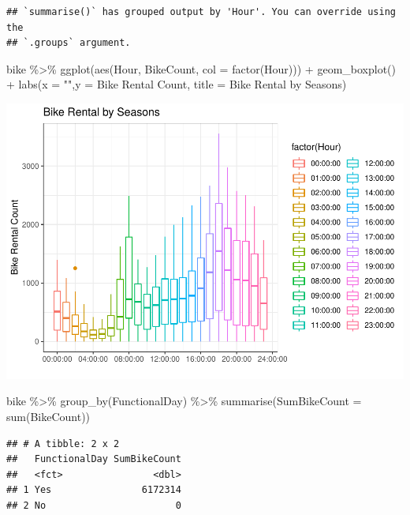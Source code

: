 \documentclass[
]{article}
\newenvironment{Shaded}{\begin{snugshade}}{\end{snugshade}}
\newcommand{\AttributeTok}[1]{\textcolor[rgb]{0.77,0.63,0.00}{#1}}
\newcommand{\FunctionTok}[1]{\textcolor[rgb]{0.00,0.00,0.00}{#1}}
\newcommand{\NormalTok}[1]{#1}
\newcommand{\SpecialCharTok}[1]{\textcolor[rgb]{0.00,0.00,0.00}{#1}}
\newcommand{\StringTok}[1]{\textcolor[rgb]{0.31,0.60,0.02}{#1}}
\begin{document}
\begin{verbatim}
## `summarise()` has grouped output by 'Hour'. You can override using the
## `.groups` argument.
\end{verbatim}

\begin{Shaded}
\begin{Highlighting}[]
\NormalTok{bike }\SpecialCharTok{\%\textgreater{}\%}
  \FunctionTok{ggplot}\NormalTok{(}\FunctionTok{aes}\NormalTok{(Hour, BikeCount, }\AttributeTok{col =} \FunctionTok{factor}\NormalTok{(Hour))) }\SpecialCharTok{+}
  \FunctionTok{geom\_boxplot}\NormalTok{() }\SpecialCharTok{+} 
  \FunctionTok{labs}\NormalTok{(}\AttributeTok{x =} \StringTok{""}\NormalTok{,}\AttributeTok{y =} \StringTok{\textquotesingle{}Bike Rental Count\textquotesingle{}}\NormalTok{, }
       \AttributeTok{title =} \StringTok{\textquotesingle{}Bike Rental by Seasons\textquotesingle{}}\NormalTok{) }
\end{Highlighting}
\end{Shaded}

\includegraphics{BikeProject_files/figure-latex/EDA-1.pdf}

\begin{Shaded}
\begin{Highlighting}[]
\NormalTok{bike }\SpecialCharTok{\%\textgreater{}\%} \FunctionTok{group\_by}\NormalTok{(FunctionalDay) }\SpecialCharTok{\%\textgreater{}\%}
  \FunctionTok{summarise}\NormalTok{(}\AttributeTok{SumBikeCount =} \FunctionTok{sum}\NormalTok{(BikeCount)) }
\end{Highlighting}
\end{Shaded}

\begin{verbatim}
## # A tibble: 2 x 2
##   FunctionalDay SumBikeCount
##   <fct>                <dbl>
## 1 Yes                6172314
## 2 No                       0
\end{verbatim}
\end{document}
